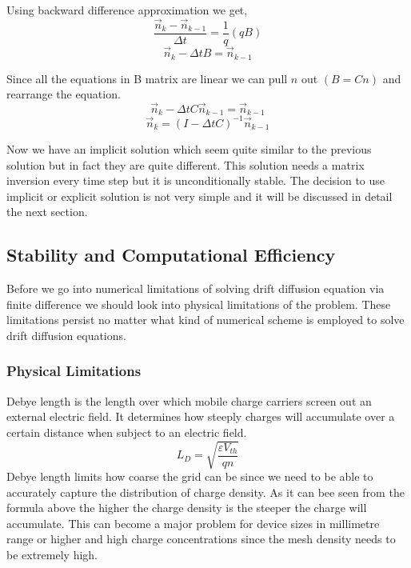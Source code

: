 Using backward difference approximation we get,
\begin{equation}\nonumber
\frac{ \vec{n}_{k}-\vec{n}_{k-1}}{\Delta t}=\frac{1}{q}(qB)
\end{equation}
\begin{equation}\nonumber
\vec{n}_{k}-\Delta t B =\vec{n}_{k-1}
\end{equation}

Since all the equations in B matrix are linear we can pull $n$ out $(B=Cn)$ and rearrange the equation.
\begin{equation}\nonumber
\vec{n}_{k}-\Delta t C\vec{n}_{k-1} =\vec{n}_{k-1}
\end{equation}
\begin{equation}
\vec{n}_k=(I-\Delta t C)^{-1}\vec{n}_{k-1}
\end{equation}

Now we have an implicit solution which seem quite similar to the previous solution but in fact they are quite different. This solution needs a matrix inversion every time step but it is unconditionally stable. The decision to use implicit or explicit solution is not very simple and it will be discussed in detail the next section.
\clearpage
\subsection{Stability and Computational Efficiency}
Before we go into numerical limitations of solving drift diffusion equation via finite difference we should look into physical limitations of the problem. These limitations persist no matter what kind of numerical scheme is employed to solve drift diffusion equations.

\subsubsection{Physical Limitations}
Debye length is the length over which mobile charge carriers screen out an external electric field. It determines how steeply charges will accumulate over a certain distance when subject to an electric field. 
\begin{equation}
L_D=\sqrt{\frac{\varepsilon V_{th}}{q n}}
\end{equation}
Debye length limits how coarse the grid can be since we need to be able to accurately capture the distribution of charge density. As it can bee seen from the formula above the higher the charge density is the steeper the charge will accumulate. This can become a major problem for device sizes in millimetre range or higher and high charge concentrations since the mesh density needs to be extremely high.

